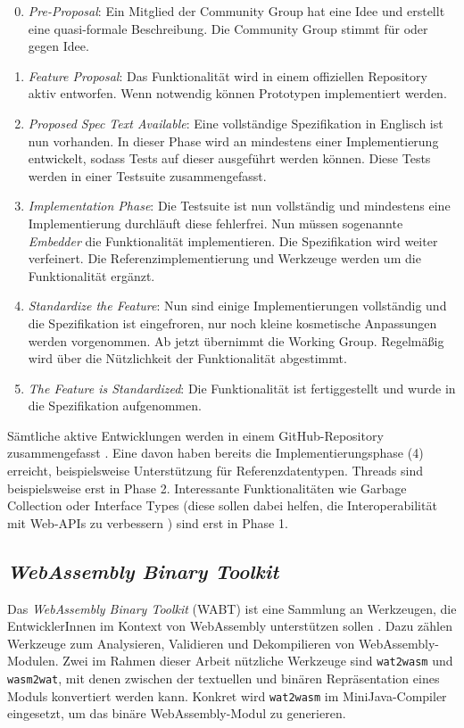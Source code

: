 \begin{enumerate}
    \setcounter{enumi}{-1}
    \item \emph{Pre-Proposal}: Ein Mitglied der Community Group hat eine Idee und erstellt eine quasi-formale Beschreibung. Die Community Group stimmt für oder gegen Idee.
    \item \emph{Feature Proposal}: Das Funktionalität wird in einem offiziellen Repository aktiv entworfen. Wenn notwendig können Prototypen implementiert werden.
    \item \emph{Proposed Spec Text Available}: Eine vollständige Spezifikation in Englisch ist nun vorhanden. In dieser Phase wird an mindestens einer Implementierung entwickelt, sodass Tests auf dieser ausgeführt werden können. Diese Tests werden in einer Testsuite zusammengefasst.
    \item \emph{Implementation Phase}: Die Testsuite ist nun vollständig und mindestens eine Implementierung durchläuft diese fehlerfrei. Nun müssen sogenannte \emph{Embedder} die Funktionalität implementieren. Die Spezifikation wird weiter verfeinert. Die Referenzimplementierung und Werkzeuge werden um die Funktionalität ergänzt.
    \item \emph{Standardize the Feature}: Nun sind einige Implementierungen vollständig und die Spezifikation ist eingefroren, nur noch kleine kosmetische Anpassungen werden vorgenommen. Ab jetzt übernimmt die Working Group. Regelmäßig wird über die Nützlichkeit der Funktionalität abgestimmt.
    \item \emph{The Feature is Standardized}: Die Funktionalität ist fertiggestellt und wurde in die Spezifikation aufgenommen.
\end{enumerate}

Sämtliche aktive Entwicklungen werden in einem GitHub-Repository zusammengefasst \cite{WebAssemblyProposals}.
Eine davon haben bereits die Implementierungsphase (4) erreicht, beispielsweise Unterstützung für Referenzdatentypen. Threads sind beispielsweise erst in Phase 2. Interessante Funktionalitäten wie Garbage Collection oder Interface Types (diese sollen dabei helfen, die Interoperabilität mit Web-APIs zu verbessern \cite{WebAssemblyInterfaceTypes}) sind erst in Phase 1.

\subsection{\emph{WebAssembly Binary Toolkit}}
Das \emph{WebAssembly Binary Toolkit} (WABT) ist eine Sammlung an Werkzeugen, die EntwicklerInnen im Kontext von WebAssembly unterstützen sollen \cite{WABT}. Dazu zählen Werkzeuge zum Analysieren, Validieren und Dekompilieren von WebAssembly-Modulen. Zwei im Rahmen dieser Arbeit nützliche Werkzeuge sind \lstinline{wat2wasm} und \lstinline{wasm2wat}, mit denen zwischen der textuellen und binären Repräsentation eines Moduls konvertiert werden kann. Konkret wird \lstinline{wat2wasm} im MiniJava-Compiler eingesetzt, um das binäre WebAssembly-Modul zu generieren.

